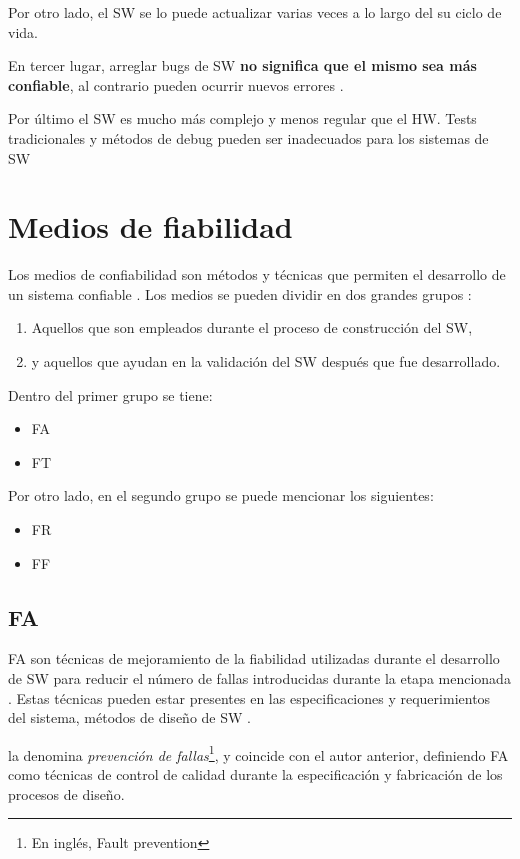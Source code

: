 Por otro lado, el \ac{SW} se lo puede actualizar varias veces a lo largo del su ciclo de vida.

En tercer lugar, arreglar bugs de \ac{SW} \textbf{no significa que el mismo sea más confiable}, al contrario pueden ocurrir nuevos errores \citep{FTDesign}.

Por último el \ac{SW} es mucho más complejo y menos regular que el \ac{HW}. Tests tradicionales y métodos de debug pueden ser inadecuados para los sistemas de \ac{SW}

\section{Medios de fiabilidad}\label{sec:medios_falla}
Los medios de confiabilidad son métodos y técnicas que permiten el desarrollo de un sistema
confiable \citep{FTDesign}. Los medios se pueden dividir en dos grandes grupos \citep{Pullum01}:
\begin{enumerate}
 \item Aquellos que son empleados durante el proceso de construcción del \ac{SW},
 \item y aquellos que ayudan en la validación del \ac{SW} después que fue desarrollado.
\end{enumerate}

Dentro del primer grupo se tiene:
\begin{itemize}
 \item \acl{FA}
 \item \acl{FT}
\end{itemize}

Por otro lado, en el segundo grupo se puede mencionar los siguientes:
\begin{itemize}
 \item \acl{FR}
 \item \acl{FF}
\end{itemize}

\subsection{\acl{FA}}
\ac{FA} son técnicas de mejoramiento de la fiabilidad utilizadas durante el desarrollo de \ac{SW}
para reducir el número de fallas introducidas durante la etapa mencionada \citep{Pullum01}. Estas
técnicas pueden estar presentes en las especificaciones y requerimientos del sistema, métodos de
diseño de \ac{SW} \citep{Pullum01}.

\cite{FTDesign} la denomina \textit{prevención de fallas}\footnote{En inglés, Fault prevention}, y
coincide con el autor anterior, definiendo \ac{FA} como técnicas de control de calidad durante la
especificación y fabricación de los procesos de diseño.


